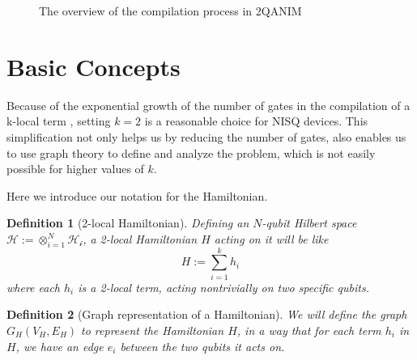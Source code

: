 \documentclass{article}
\newtheorem{defn}{Definition}
\begin{document}
  \begin{figure}[h]
    \centering
  \caption{The overview of the compilation process in 2QANIM}
\end{figure}

  \section{Basic Concepts}

  Because of the exponential growth of the number of gates in the compilation of a k-local term \cite{?}, setting $k=2$ is a reasonable choice for NISQ devices. This simplification not only helps us by reducing the number of gates, also enables us to use graph theory to define and analyze the problem, which is not easily possible for higher values of $k$.

  Here we introduce our notation for the Hamiltonian.

  \begin{defn}[2-local Hamiltonian]
    \label{defn:2-local-hamiltonian}
    Defining an $N$-qubit Hilbert space
    $\mathcal{H} := \otimes_{i=1}^{N} \mathcal{H_i}$, a 2-local Hamiltonian $H$ acting on it will be like
    \begin{equation}
      H := \sum_{i=1}^{k} h_i
    \end{equation}
    where each $h_i$ is a 2-local term, acting nontrivially on two specific qubits.
  \end{defn}
  \begin{defn}[Graph representation of a Hamiltonian]
    We will define the graph $G_H(V_H, E_H)$ to represent the Hamiltonian $H$, in a way that for each term $h_i$ in $H$, we have an edge $e_i$ between the two qubits it acts on.
  \end{defn}
\end{document}
